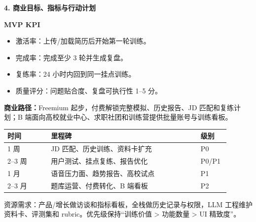 \documentclass[UTF8,zihao=5]{ctexart}
\newcommand{\sectionline}[1]{%
  \vspace{0.18em}
  {\large\bfseries\color{memored} #1}\par
  \vspace{-0.35em}{\color{memored}\rule{\linewidth}{0.45pt}}\vspace{-0.2em}
}
\begin{document}
\sectionline{4. 商业目标、指标与行动计划}
\begin{minipage}[t]{0.48\linewidth}
\small
\textbf{MVP KPI}
\begin{itemize}
  \item 激活率：上传/加载简历后开始第一轮训练。
  \item 完成率：完成至少 3 轮并生成复盘。
  \item 复练率：24 小时内回到同一挂点训练。
  \item 质量评分：问题贴合度、复盘可执行性 1--5 分。
\end{itemize}
\textbf{商业路径：}Freemium 起步，付费解锁完整模拟、历史报告、JD 匹配和复练计划；B 端面向高校就业中心、求职社团和训练营提供批量账号与训练看板。
\end{minipage}
\hfill
\begin{minipage}[t]{0.49\linewidth}
\footnotesize
\begin{tabular}{p{0.18\linewidth}p{0.62\linewidth}p{0.12\linewidth}}
\toprule
时间 & 里程碑 & 级别 \\
\midrule
1 周 & JD 匹配、历史训练、资料卡扩充 & P0 \\
2--3 周 & 用户测试、挂点复练、报告优化 & P0/P1 \\
1 月 & 语音压力面、趋势报告、高校试点 & P1 \\
2--3 月 & 题库运营、付费转化、B 端看板 & P2 \\
\bottomrule
\end{tabular}
\vspace{0.25em}

资源需求：产品/增长做访谈和指标看板，全栈做历史记录与权限，LLM 工程维护资料卡、评测集和 rubric。优先级保持“训练价值 > 功能数量 > UI 精致度”。
\end{minipage}
\end{document}
